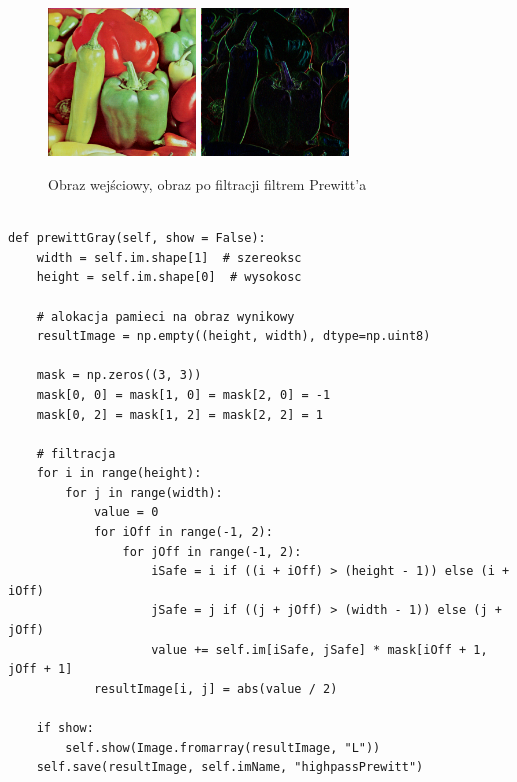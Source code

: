 \documentclass[final,a4paper,openany,12pt]{mwbk}
\begin{document}
\begin{figure}[H]
	\begin{center}
		\includegraphics[width=0.35\textwidth]{peppers_color}
		\includegraphics[width=0.35\textwidth]{peppers_color_highpassPrewitt_result}
	\end{center}
	\caption{Obraz wejściowy, obraz po filtracji filtrem Prewitt'a}
\end{figure}
\newpage


\begin{lstlisting}[caption=Operator Prewitt'a (obraz szary)]
	
def prewittGray(self, show = False):
	width = self.im.shape[1]  # szereoksc
	height = self.im.shape[0]  # wysokosc
	
	# alokacja pamieci na obraz wynikowy
	resultImage = np.empty((height, width), dtype=np.uint8)
	
	mask = np.zeros((3, 3))
	mask[0, 0] = mask[1, 0] = mask[2, 0] = -1
	mask[0, 2] = mask[1, 2] = mask[2, 2] = 1
	
	# filtracja
	for i in range(height):
		for j in range(width):
			value = 0
			for iOff in range(-1, 2):
				for jOff in range(-1, 2):
					iSafe = i if ((i + iOff) > (height - 1)) else (i + iOff)
					jSafe = j if ((j + jOff) > (width - 1)) else (j + jOff)
					value += self.im[iSafe, jSafe] * mask[iOff + 1, jOff + 1]
			resultImage[i, j] = abs(value / 2)
	
	if show:
		self.show(Image.fromarray(resultImage, "L"))
	self.save(resultImage, self.imName, "highpassPrewitt")
	
\end{lstlisting}
\end{document}
